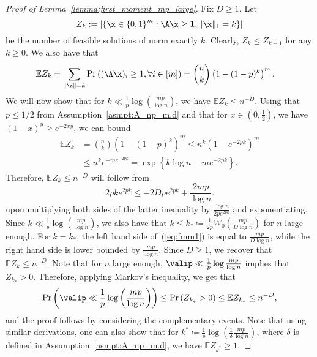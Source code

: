 \begin{proof}[Proof of Lemma~\ref{lemma:first_moment_mp_large}]
Fix \(D \geq 1\).
Let \[Z_k := \lvert\left\{  \x \in \left \{0,1\right\}^m : \A\x \geq \mathbf{1}, \|\x\|_1 = k \right \}\rvert \]
 be the number of feasible solutions of norm exactly $k$. Clearly, \(Z_k \leq Z_{k+1}\) for any \(k \geq 0\). We also have that
\begin{align*}
    \mathbb{E}Z_k & = \sum_{\|\x\| = k}\Pr\left({(\A\x)_i \geq 1, \forall i\in [m]}\right) = \binom{n}{k}\left(1-(1-p)^k\right)^m.
\end{align*}
We will now show that for \(k \ll \frac{1}{p}\log\left(\frac{mp}{\log n}\right)\), we have \(\mathbb{E} Z_{k} \leq n^{-D}\). Using that \(p \leq 1/2\) from Assumption~\ref{asmpt:A_np_m.d} and that for \(x \in (0, \frac{1}{2})\), we have \((1 - x)^y \geq e^{-2xy}\), we can bound
    \begin{equation*}
    \begin{aligned}
        \mathbb{E} Z_k &= \binom{n}{k} (1 - (1 - p)^k)^m \leq n^k \left(1 - e^{-2pk}\right)^m \\
        &\leq n^k e^{-m e^{-2pk}} = \exp \left\{k \log n - m e^{-2pk}\right\}.
    \end{aligned}
    \end{equation*}
Therefore, \(\mathbb{E}Z_k \leq n^{-D}\) will follow from 
\begin{equation}
\label{eq:fmm1}
    2pk e^{2pk} \leq -2Dpe^{2pk} + \frac{2mp}{\log n}.
\end{equation}
upon multiplying both sides of the latter inequality by \(\frac{\log n}{2p e^{2pk}}\) and exponentiating. Since \(k \ll \frac{1}{p} \log \left(\frac{mp}{\log n}\right)\), we also have that \(k \leq k_{\ast} \coloneqq \frac{1}{2p} W_0 \left(\frac{mp}{D \log n}\right) \) for \(n\) large enough. For \(k = k_{\ast}\),
the left hand side of~(\ref{eq:fmm1}) is equal to \(\frac{mp}{D \log n}\), while the right hand side is lower bounded by \(\frac{mp}{\log n}\). Since \(D \geq 1\), we recover that \(\mathbb{E}Z_k \leq n^{-D}\). Note that for \(n\) large enough, \(\valip \ll \frac 1 p \log \frac{mp}{\log n}\) implies that \(Z_{k_{\ast}} > 0\). Therefore, applying Markov's inequality, we get that 
\begin{equation}
\begin{aligned}
\Pr\left(\valip \ll \frac{1}{p} \log \left(\frac{mp}{\log n}\right)\right) \leq \Pr\left(Z_{k_{\ast}} > 0\right) \leq \mathbb{E} Z_{k_{\ast}} \leq n^{-D},
\end{aligned}
\end{equation}
and the proof follows by considering the complementary events. Note that using similar derivations, one can also show that for \(k^{\ast} \coloneqq \frac{1}{p}\log\left(\frac{1}{\delta}\frac{mp}{\log n}\right)\), where \(\delta\) is defined in Assumption~\ref{asmpt:A_np_m.d}, we have \(\mathbb{E} Z_{k^{\ast}} \geq 1\).
\end{proof}
